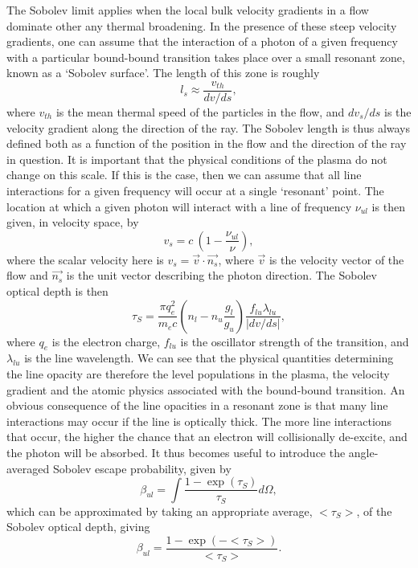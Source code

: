 The Sobolev limit applies when the local bulk velocity gradients in a flow 
dominate other any thermal broadening. In the presence of these steep
velocity gradients, one can assume that the interaction of a photon of a given frequency
with a particular 
bound-bound transition takes place over a small resonant zone, known as a 
`Sobolev surface'. The length of this zone is roughly
\begin{equation}
l_s \approx \frac{v_{th}}{dv / ds},
\end{equation}
where $v_{th}$ is the mean thermal speed of the particles in the flow, and 
$dv_s / ds$ is the velocity gradient along the direction of the ray. 
The Sobolev length is thus always defined
both as a function of the position in the flow and the direction of the ray in question.
It is important that the physical conditions of the plasma do not change on this scale.
If this is the case, then we can assume that all line interactions for a given 
frequency will occur at a single `resonant' point. The location at which
a given photon will interact with a line of frequency $\nu_{ul}$
is then given, in velocity space, by
\begin{equation}
v_s = c~\left(1 - \frac{\nu_{ul}}{\nu}\right),
\label{eq:resonance}
\end{equation}
where the scalar velocity here is $v_s=\vec{v}\cdot \vec{n_s}$, where $\vec{v}$
is the velocity vector of the flow and $\vec{n_s}$ is the unit vector describing the
photon direction. The Sobolev optical depth is then
\begin{equation}
\tau_S = \frac{\pi q_e^2}{m_e c}  \left(n_l - n_u \frac{g_l}{g_u} \right) \frac{f_{lu} \lambda_{lu}}{| dv / ds |},
\label{eq:tau_sob}
\end{equation}
where $q_e$ is the electron charge, $f_{lu}$ is the oscillator strength of the transition,
and $\lambda_{lu}$ is the line wavelength.
We can see that the physical quantities determining the line opacity are therefore 
the level populations in the plasma, the velocity gradient and the atomic physics
associated with the bound-bound transition. An obvious consequence of the line opacities
in a resonant zone is that many line interactions may occur if the line is
optically thick. The more line interactions that occur, the higher the chance
that an electron will collisionally de-excite, and the photon will be absorbed.
It thus becomes useful to introduce the angle-averaged Sobolev escape probability,
given by
\begin{equation}
\beta_{ul} = \int \frac{1 - \exp(\tau_S)}{\tau_S} d\Omega,
\label{eq:beta_sob}
\end{equation}
which can be approximated by taking an appropriate
average, $<\tau_S>$, of the Sobolev optical depth, giving 
\begin{equation}
\beta_{ul} = \frac{1 - \exp(-<\tau_S>)}{<\tau_S>}.
\label{eq:beta_sob}
\end{equation}


